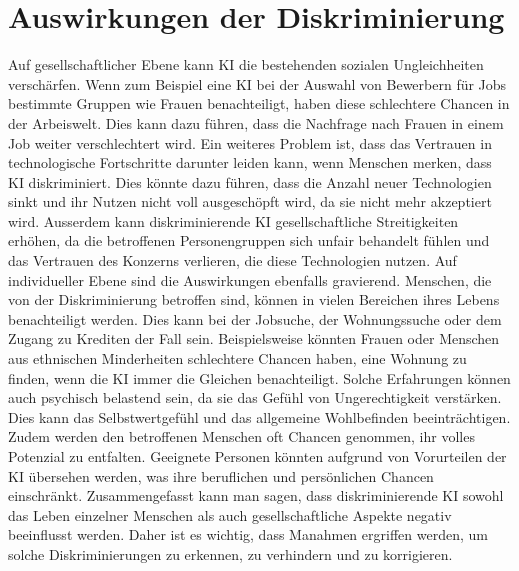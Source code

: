 \documentclass{article}
\begin{document}
\section{Auswirkungen der Diskriminierung}
Auf gesellschaftlicher Ebene kann KI die bestehenden sozialen Ungleichheiten verschärfen. Wenn zum Beispiel eine KI bei der Auswahl von Bewerbern für Jobs bestimmte Gruppen wie Frauen benachteiligt, haben diese schlechtere Chancen in der Arbeiswelt. Dies kann dazu führen, dass die Nachfrage nach Frauen in einem Job weiter verschlechtert wird. Ein weiteres Problem ist, dass das Vertrauen in technologische Fortschritte darunter leiden kann, wenn Menschen merken, dass KI diskriminiert. Dies könnte dazu führen, dass die Anzahl neuer Technologien sinkt und ihr Nutzen nicht voll ausgeschöpft wird, da sie nicht mehr akzeptiert wird. Ausserdem kann diskriminierende KI gesellschaftliche Streitigkeiten erhöhen, da die betroffenen Personengruppen sich unfair behandelt fühlen und das Vertrauen des Konzerns verlieren, die diese Technologien nutzen. Auf individueller Ebene sind die Auswirkungen ebenfalls gravierend. Menschen, die von der Diskriminierung betroffen sind, können in vielen Bereichen ihres Lebens benachteiligt werden. Dies kann bei der Jobsuche, der Wohnungssuche oder dem Zugang zu Krediten der Fall sein. Beispielsweise könnten Frauen oder Menschen aus ethnischen Minderheiten schlechtere Chancen haben, eine Wohnung zu finden, wenn die KI immer die Gleichen benachteiligt. Solche Erfahrungen können auch psychisch belastend sein, da sie das Gefühl von Ungerechtigkeit verstärken. Dies kann das Selbstwertgefühl und das allgemeine Wohlbefinden beeinträchtigen. Zudem werden den betroffenen Menschen oft Chancen genommen, ihr volles Potenzial zu entfalten. Geeignete Personen könnten aufgrund von Vorurteilen der KI übersehen werden, was ihre beruflichen und persönlichen Chancen einschränkt. Zusammengefasst kann man sagen, dass diskriminierende KI sowohl das Leben einzelner Menschen als auch gesellschaftliche Aspekte negativ beeinflusst werden. Daher ist es wichtig, dass Manahmen ergriffen werden, um solche Diskriminierungen zu erkennen, zu verhindern und zu korrigieren. 
\end{document}
